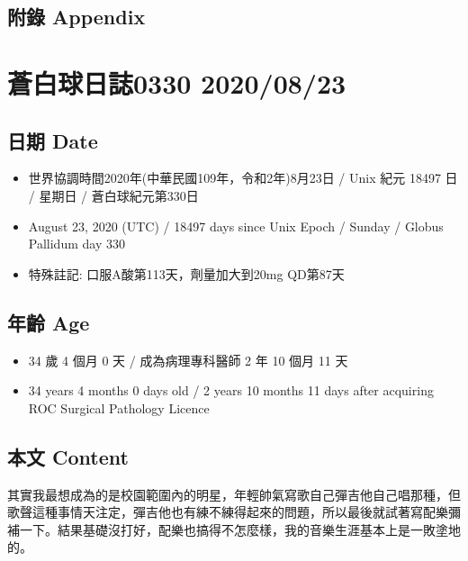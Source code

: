 \documentclass[
]{article}
\providecommand{\tightlist}{%
  \setlength{\itemsep}{0pt}\setlength{\parskip}{0pt}}
\begin{document}
\hypertarget{ux9644ux9304-appendix-21}{%
\subsection{附錄 Appendix}\label{ux9644ux9304-appendix-21}}

\hypertarget{ux84bcux767dux7403ux65e5ux8a8c0330-20200823}{%
\section{蒼白球日誌0330
2020/08/23}\label{ux84bcux767dux7403ux65e5ux8a8c0330-20200823}}

\hypertarget{ux65e5ux671f-date-22}{%
\subsection{日期 Date}\label{ux65e5ux671f-date-22}}

\begin{itemize}
\tightlist
\item
  世界協調時間2020年(中華民國109年，令和2年)8月23日 / Unix 紀元 18497 日
  / 星期日 / 蒼白球紀元第330日
\item
  August 23, 2020 (UTC) / 18497 days since Unix Epoch / Sunday / Globus
  Pallidum day 330
\item
  特殊註記: 口服A酸第113天，劑量加大到20mg QD第87天
\end{itemize}

\hypertarget{ux5e74ux9f61-age-22}{%
\subsection{年齡 Age}\label{ux5e74ux9f61-age-22}}

\begin{itemize}
\tightlist
\item
  34 歲 4 個月 0 天 / 成為病理專科醫師 2 年 10 個月 11 天
\item
  34 years 4 months 0 days old / 2 years 10 months 11 days after
  acquiring ROC Surgical Pathology Licence
\end{itemize}

\hypertarget{ux672cux6587-content-22}{%
\subsection{本文 Content}\label{ux672cux6587-content-22}}

其實我最想成為的是校園範圍內的明星，年輕帥氣寫歌自己彈吉他自己唱那種，但歌聲這種事情天注定，彈吉他也有練不練得起來的問題，所以最後就試著寫配樂彌補一下。結果基礎沒打好，配樂也搞得不怎麼樣，我的音樂生涯基本上是一敗塗地的。
\end{document}
